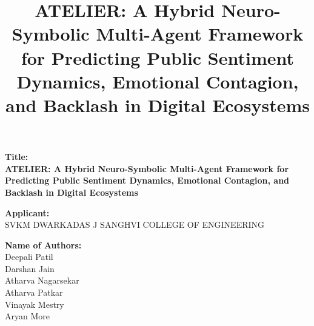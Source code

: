 \documentclass[12pt]{IEEEtran}
\begin{document}
\begin{titlepage}
\centering
\vspace*{\fill}

{\Large \textbf{Title:}\\
\textbf {ATELIER: A Hybrid Neuro-Symbolic Multi-Agent Framework for Predicting Public Sentiment Dynamics, Emotional Contagion, and Backlash in Digital Ecosystems} \par}

\vspace*{\fill}

{\Large \textbf{Applicant:}\\
SVKM DWARKADAS J SANGHVI COLLEGE OF ENGINEERING\par}

\vspace*{\fill}

{\Large \textbf{Name of Authors:}\\
Deepali Patil \\
Darshan Jain \\
Atharva Nagarsekar \\
Atharva Patkar \\
Vinayak Mestry \\
Aryan More \par}

\vspace*{\fill}
\end{titlepage}

\title{ATELIER: A Hybrid Neuro-Symbolic Multi-Agent Framework for Predicting Public Sentiment Dynamics, Emotional Contagion, and Backlash in Digital Ecosystems}

\author{

}

\maketitle
\end{document}
